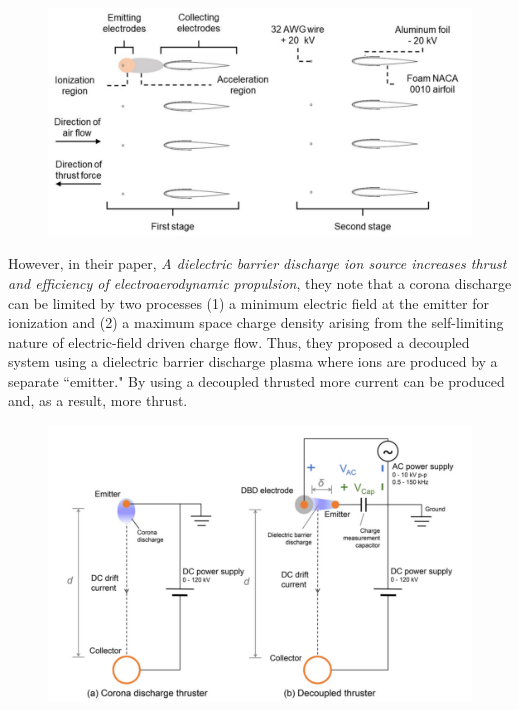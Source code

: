 \documentclass[12pt]{article}
\begin{document}
\begin{figure}[h]
\centering
\includegraphics[width=\linewidth]{images/thrustdiagram.pdf}
\end{figure}

\par
However, in their paper, \textit{A dielectric barrier discharge ion source increases thrust and efficiency of electroaerodynamic propulsion}, they note that a corona discharge can be limited by two processes (1) a minimum electric field at the emitter for ionization and (2) a maximum space charge density arising from the self-limiting nature of electric-field driven charge flow. Thus, they proposed a decoupled system using a dielectric barrier discharge plasma where ions are produced by a separate ``emitter." By using a decoupled thrusted more current can be produced and, as a result, more thrust. 

\begin{figure}[h]
\centering
\includegraphics[width=\linewidth]{images/dbd thruster schematic.pdf}
\end{figure}
\end{document}
